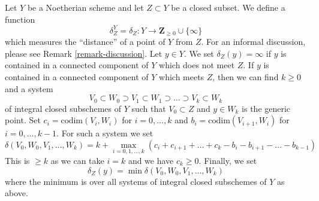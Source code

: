 \noindent
Let $Y$ be a Noetherian scheme and let $Z \subset Y$ be a closed subset.
We define a function
\begin{equation}
\label{equation-delta-Z}
\delta^Y_Z = \delta_Z : Y \longrightarrow \mathbf{Z}_{\geq 0} \cup \{\infty\}
\end{equation}
which measures the ``distance'' of a point of $Y$ from $Z$.
For an informal discussion, please see Remark \ref{remark-discussion}.
Let $y \in Y$. We set $\delta_Z(y) = \infty$ if $y$ is contained
in a connected component of $Y$ which does not meet $Z$.
If $y$ is contained in a connected component of $Y$ which meets $Z$,
then we can find $k \geq 0$ and a system
$$
V_0 \subset W_0 \supset V_1 \subset W_1 \supset \ldots \supset
V_k \subset W_k
$$
of integral closed subschemes of $Y$ such that $V_0 \subset Z$
and $y \in W_k$ is the generic point. Set
$c_i = \text{codim}(V_i, W_i)$ for $i = 0, \ldots, k$
and $b_i = \text{codim}(V_{i + 1}, W_i)$ for $i = 0, \ldots, k - 1$.
For such a system we set
$$
\delta(V_0, W_0, V_1, \ldots, W_k) =
k +
\max_{i = 0, 1, \ldots, k}
(c_i + c_{i + 1} + \ldots + c_k - b_i - b_{i + 1} - \ldots - b_{k - 1})
$$
This is $\geq k$ as we can take $i = k$ and we have $c_k \geq 0$.
Finally, we set
$$
\delta_Z(y) = \min \delta(V_0, W_0, V_1, \ldots, W_k)
$$
where the minimum is over all systems of integral closed subschemes of $Y$
as above.

